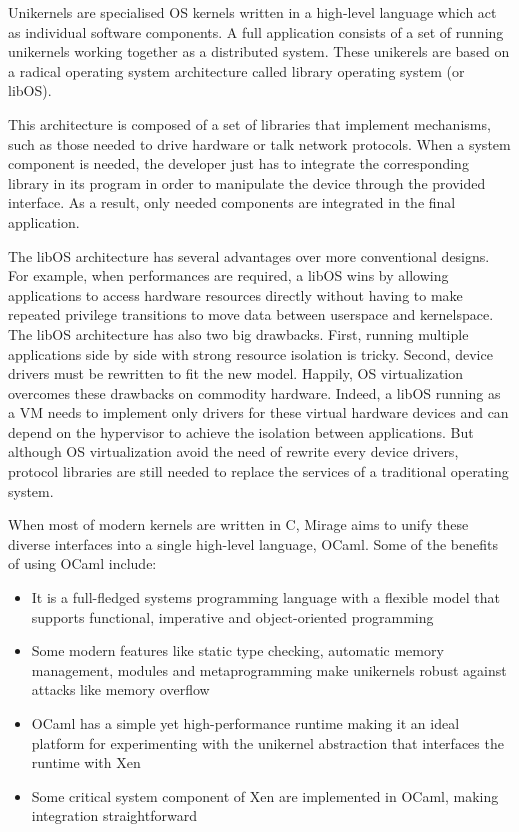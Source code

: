 \documentclass{article}
\renewcommand{\-}{\hyp}
\newcommand{\mirage}{Mirage\xspace}
\newcommand{\ocaml}{OCaml\xspace}
\newcommand{\xen}{Xen\xspace}
\begin{document}
Unikernels are specialised OS kernels written in a high-level language which act as individual software components.
A full application consists of a set of running unikernels working together as a distributed system.
These unikerels are based on a radical operating system architecture called library operating system (or libOS)\cite{LibraryOperatingSystemsCloud2013}.

This architecture is composed of a set of libraries that implement mechanisms, such as those needed to drive hardware or talk network protocols.
When a system component is needed, the developer just has to integrate the corresponding library in its program in order to manipulate the device through the provided interface.
As a result, only needed components are integrated in the final application.

The libOS architecture has several advantages over more conventional designs.
For example, when performances are required, a libOS wins by allowing applications to access hardware resources directly without having to make repeated privilege transitions to move data between userspace and kernelspace.
The libOS architecture has also two big drawbacks.
First, running multiple applications side by side with strong resource isolation is tricky.
Second, device drivers must be rewritten to fit the new model.
Happily, OS virtualization overcomes these drawbacks on commodity hardware.
Indeed, a libOS running as a VM needs to implement only drivers for these virtual hardware devices and can depend on the hypervisor to achieve the isolation between applications.
But although OS virtualization avoid the need of rewrite every device drivers, protocol libraries are still needed to replace the services of a traditional operating system.

When most of modern kernels are written in C, \mirage aims to unify these diverse interfaces into a single high-level language, \ocaml.
Some of the benefits of using \ocaml include:

\begin{itemize}
	\item It is a full-fledged systems programming language with a flexible model that supports functional, imperative and object-oriented programming
	\item Some modern features like static type checking, automatic memory management, modules and metaprogramming make unikernels robust\cite{CreatingFunctionalInternet2007} against attacks like memory overflow
	\item \ocaml has a simple yet high-performance runtime making it an ideal platform for experimenting with the unikernel abstraction that interfaces the runtime with \xen
	\item Some critical system component of \xen  are implemented in \ocaml, making integration straightforward
\end{itemize}
\end{document}
